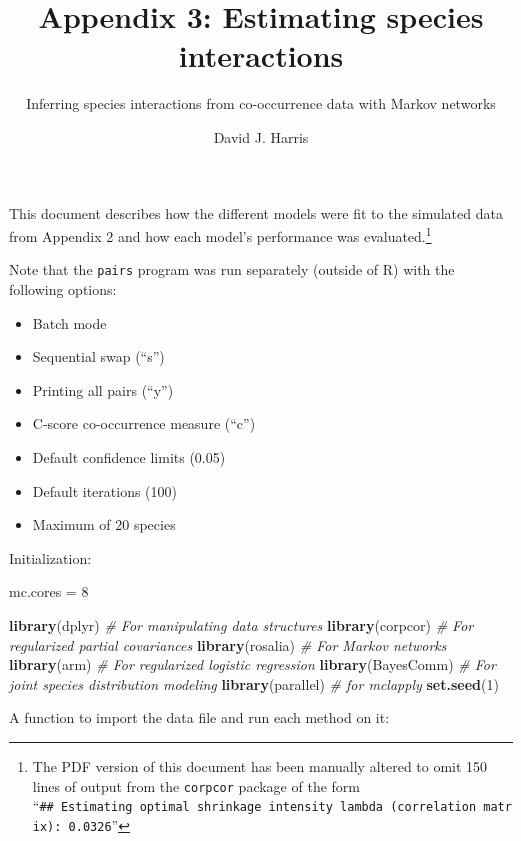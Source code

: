 \documentclass[11pt,]{article}
\title{Appendix 3: Estimating species interactions}
\subtitle{Inferring species interactions from co-occurrence data with Markov
networks}
\author{David J. Harris}
\date{}
\newenvironment{Shaded}{\begin{snugshade}}{\end{snugshade}}
\newcommand{\KeywordTok}[1]{\textcolor[rgb]{0.13,0.29,0.53}{\textbf{{#1}}}}
\newcommand{\DecValTok}[1]{\textcolor[rgb]{0.00,0.00,0.81}{{#1}}}
\newcommand{\StringTok}[1]{\textcolor[rgb]{0.31,0.60,0.02}{{#1}}}
\newcommand{\CommentTok}[1]{\textcolor[rgb]{0.56,0.35,0.01}{\textit{{#1}}}}
\newcommand{\NormalTok}[1]{{#1}}
\providecommand{\tightlist}{%
  \setlength{\itemsep}{0pt}\setlength{\parskip}{0pt}}
\let\rmarkdownfootnote\footnote%
\def\footnote{\protect\rmarkdownfootnote}
\begin{document}
\maketitle

This document describes how the different models were fit to the
simulated data from Appendix 2 and how each model's performance was
evaluated.\footnote{The PDF version of this document has been manually
  altered to omit 150 lines of output from the \texttt{corpcor} package
  of the form
  ``\texttt{\#\#\ Estimating\ optimal\ shrinkage\ intensity\ lambda\ (correlation\ matrix):\ 0.0326}''}

Note that the \texttt{pairs} program was run separately (outside of R)
with the following options:

\begin{itemize}
\tightlist
\item
  Batch mode
\item
  Sequential swap (``s'')
\item
  Printing all pairs (``y'')
\item
  C-score co-occurrence measure (``c'')
\item
  Default confidence limits (0.05)
\item
  Default iterations (100)
\item
  Maximum of 20 species
\end{itemize}

Initialization:

\begin{Shaded}
\begin{Highlighting}[]
\NormalTok{mc.cores =}\StringTok{ }\DecValTok{8}

\KeywordTok{library}\NormalTok{(dplyr)        }\CommentTok{# For manipulating data structures}
\KeywordTok{library}\NormalTok{(corpcor)      }\CommentTok{# For regularized partial covariances}
\KeywordTok{library}\NormalTok{(rosalia)      }\CommentTok{# For Markov networks}
\KeywordTok{library}\NormalTok{(arm)          }\CommentTok{# For regularized logistic regression}
\KeywordTok{library}\NormalTok{(BayesComm)    }\CommentTok{# For joint species distribution modeling}
\KeywordTok{library}\NormalTok{(parallel)     }\CommentTok{# for mclapply}
\KeywordTok{set.seed}\NormalTok{(}\DecValTok{1}\NormalTok{)}
\end{Highlighting}
\end{Shaded}

A function to import the data file and run each method on it:
\end{document}
